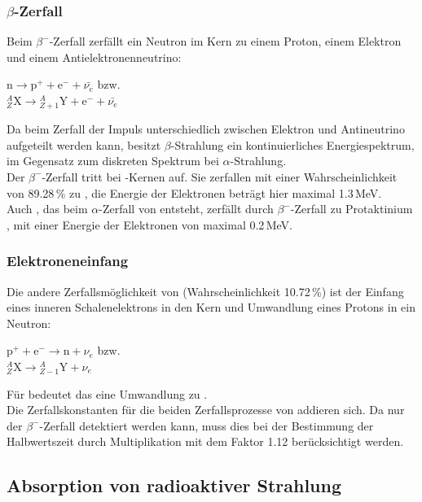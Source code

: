 \subsubsection{$\beta$-Zerfall}
Beim $\beta^-$-Zerfall zerfällt ein Neutron im Kern zu einem Proton, einem Elektron und einem
Antielektronenneutrino:
\begin{center}
$\text{n} \rightarrow \text{p}^+ + \text{e}^- +\bar{\nu_e}$ bzw.\\[0.15cm]
${}^{A}_{Z}\text{X} \rightarrow {}^{A}_{Z+1}\text{Y} + \text{e}^- + \bar{\nu_e}$
\end{center}
Da beim Zerfall der Impuls unterschiedlich zwischen Elektron und Antineutrino aufgeteilt werden kann,
besitzt $\beta$-Strahlung ein kontinuierliches Energiespektrum, im Gegensatz zum diskreten Spektrum
bei $\alpha$-Strahlung.\\
Der $\beta^-$-Zerfall tritt bei -Kernen auf.
Sie zerfallen mit einer Wahrscheinlichkeit von 89.28\,\% zu ,
die Energie der Elektronen beträgt hier maximal 1.3\,MeV.\\
Auch , das beim $\alpha$-Zerfall von  entsteht,
zerfällt durch $\beta^-$-Zerfall zu Protaktinium ,
mit einer Energie der Elektronen von maximal 0.2\,MeV.

\subsubsection{Elektroneneinfang}
Die andere Zerfallsmöglichkeit von  (Wahrscheinlichkeit 10.72\,\%)
ist der Einfang eines inneren Schalenelektrons
in den Kern und Umwandlung eines Protons in ein Neutron:
\begin{center}
$\text{p}^+ + \text{e}^- \rightarrow \text{n} + \nu_e$ bzw.\\[0.15cm]
${}^{A}_{Z}\text{X} \rightarrow {}^{A}_{Z-1}\text{Y} + \nu_e$
\end{center}
Für  bedeutet das eine Umwandlung zu .\\
Die Zerfallskonstanten für die beiden Zerfallsprozesse von  addieren sich.
Da nur der $\beta^-$-Zerfall detektiert werden kann, muss dies bei der Bestimmung der
Halbwertszeit durch Multiplikation mit dem Faktor 1.12 berücksichtigt werden.

\subsection{Absorption von radioaktiver Strahlung}
